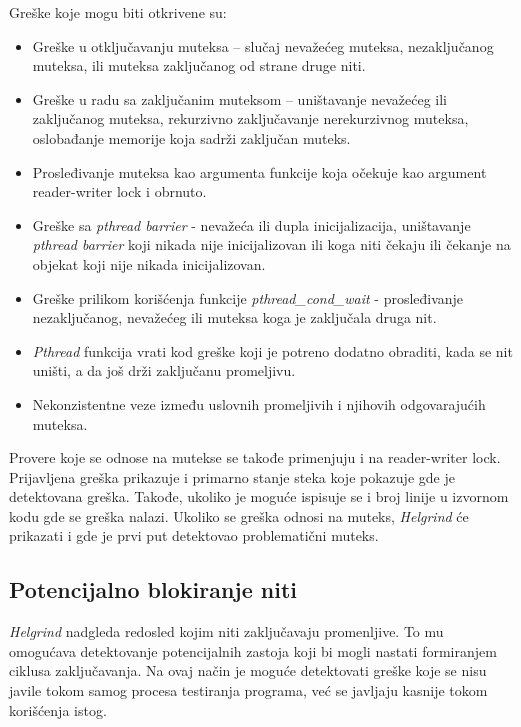 \documentclass[12pt,oneside]{memoir}
\theoremstyle{plain}
\theoremstyle{definition}
\begin{document}
Greške koje mogu biti otkrivene su:
\begin{itemize}
\item Greške u otključavanju muteksa – slučaj nevažećeg muteksa, nezaključanog muteksa, ili muteksa zaključanog od strane druge niti.
\item Greške u radu sa zaključanim muteksom – uništavanje nevažećeg ili zaključanog muteksa, rekurzivno zaključavanje nerekurzivnog muteksa, oslobađanje memorije koja sadrži zaključan muteks.
\item Prosleđivanje muteksa kao argumenta funkcije koja očekuje kao argument reader-writer lock i obrnuto.
\item Greške sa \textit{pthread barrier} - nevažeća ili dupla inicijalizacija, uništavanje \textit{pthread barrier} koji nikada nije inicijalizovan ili koga niti čekaju ili čekanje na objekat koji nije nikada inicijalizovan.
\item Greške prilikom korišćenja funkcije \textit{pthread\_cond\_wait} - prosleđivanje nezaključanog, nevažećeg ili muteksa koga je zaključala druga nit.
\item \textit{Pthread} funkcija vrati kod greške koji je potreno dodatno obraditi, kada se nit uništi, a da još drži zaključanu promeljivu.
\item Nekonzistentne veze između uslovnih promeljivih i njihovih odgovarajućih muteksa.
\end{itemize}

Provere koje se odnose na mutekse se takođe primenjuju i na reader-writer lock. Prijavljena greška prikazuje i primarno stanje steka koje pokazuje gde je detektovana greška. Takođe, ukoliko je moguće ispisuje se i broj linije u izvornom  kodu gde se greška nalazi. Ukoliko se greška odnosi na muteks, \textit{Helgrind} će prikazati i gde je prvi put detektovao problematični muteks.


\subsection{Potencijalno blokiranje niti}
\textit{Helgrind} nadgleda redosled kojim niti zaključavaju promenljive. To mu omogućava detektovanje potencijalnih zastoja koji bi mogli nastati formiranjem ciklusa zaključavanja. Na ovaj način je moguće detektovati greške koje se nisu javile tokom samog procesa testiranja programa, već se javljaju kasnije tokom korišćenja istog.
\end{document}
